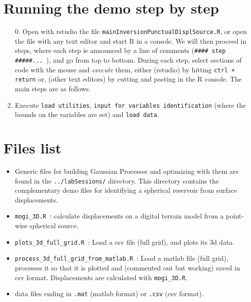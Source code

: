 \documentclass[12pt]{article}
\begin{document}
\section{Running the demo step by step}
\begin{enumerate}
\item[0.] Open with rstudio the file \texttt{mainInversionPunctualDisplSource.R}, or open the file with any text editor and start R in a console. 
We will then proceed in steps, where each step is announced by a line of comments (\verb=#### step #####... =), and go from top to bottom. 
During each step, select sections of code with the mouse and \emph{execute} them, either (rstudio) by hitting \texttt{ctrl + return} 
or, (other text editors) by cutting and pasting in the R console. The main steps are as follows.
\item Execute \texttt{load utilities}, \texttt{input for variables identification} (where the bounds on the variables are set) and \texttt{load data}.  
\end{enumerate}

\section{Files list}
\begin{itemize}
\item Generic files for building Gaussian Processes and optimizing with them are found in the \texttt{../labSessions/} directory. This directory
contains the complementary demo files for identifying a spherical reservoir from surface displacements.
\item \texttt{mogi\_3D.R}~: calculate displacements on a digital terrain model from a point-wise spherical source.
\item \texttt{plots\_3d\_full\_grid.R}~: Load a csv file (full grid), and plots its 3d data.
\item \texttt{process\_3d\_full\_grid\_from\_matlab.R}~: Load a matlab file (full grid), processes it so that it is plotted and (commented out but working) saved in csv format. Displacements are calculated with \texttt{mogi\_3D.R}.
\item data files ending in \texttt{.mat} (matlab format) or \texttt{.csv} (csv format).
\end{itemize}
\end{document}
